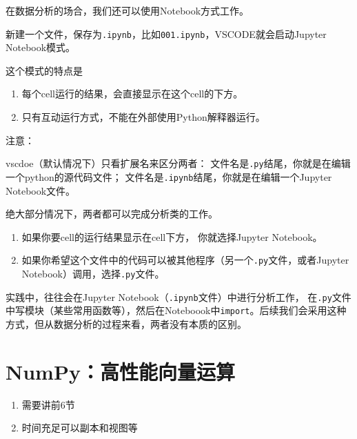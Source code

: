 \documentclass[
  letterpaper,
  DIV=11,
  numbers=noendperiod]{scrreprt}
\providecommand{\tightlist}{%
  \setlength{\itemsep}{0pt}\setlength{\parskip}{0pt}}\usepackage{longtable,booktabs,array}
\begin{document}
在数据分析的场合，我们还可以使用Notebook方式工作。

新建一个文件，保存为\texttt{.ipynb}，比如\texttt{001.ipynb}，VSCODE就会启动Jupyter
Notebook模式。

这个模式的特点是

\begin{enumerate}
\def\labelenumi{\arabic{enumi}.}
\tightlist
\item
  每个cell运行的结果，会直接显示在这个cell的下方。
\item
  只有互动运行方式，不能在外部使用Python解释器运行。
\end{enumerate}

注意：

vscdoe（默认情况下）只看扩展名来区分两者：
文件名是\texttt{.py}结尾，你就是在编辑一个python的源代码文件；
文件名是\texttt{.ipynb}结尾，你就是在编辑一个Jupyter Notebook文件。

绝大部分情况下，两者都可以完成分析类的工作。

\begin{enumerate}
\def\labelenumi{\arabic{enumi}.}
\item
  如果你要cell的运行结果显示在cell下方， 你就选择Jupyter Notebook。
\item
  如果你希望这个文件中的代码可以被其他程序（另一个\texttt{.py}文件，或者Jupyter
  Notebook）调用，选择\texttt{.py}文件。
\end{enumerate}

实践中，往往会在Jupyter Notebook（\texttt{.ipynb}文件）中进行分析工作，
在\texttt{.py}文件中写模块（某些常用函数等），然后在Noteboook中\texttt{import}。后续我们会采用这种方式，但从数据分析的过程来看，两者没有本质的区别。

\hypertarget{numpyux9ad8ux6027ux80fdux5411ux91cfux8fd0ux7b97}{%
\chapter{NumPy：高性能向量运算}\label{numpyux9ad8ux6027ux80fdux5411ux91cfux8fd0ux7b97}}

\begin{tcolorbox}[enhanced jigsaw, opacityback=0, left=2mm, coltitle=black, leftrule=.75mm, bottomtitle=1mm, arc=.35mm, opacitybacktitle=0.6, bottomrule=.15mm, breakable, colbacktitle=quarto-callout-note-color!10!white, toprule=.15mm, toptitle=1mm, colframe=quarto-callout-note-color-frame, titlerule=0mm, title=\textcolor{quarto-callout-note-color}{\faInfo}\hspace{0.5em}{Note}, rightrule=.15mm, colback=white]

\begin{enumerate}
\def\labelenumi{\arabic{enumi}.}
\tightlist
\item
  需要讲前6节
\item
  时间充足可以副本和视图等
\end{enumerate}

\end{tcolorbox}
\end{document}

